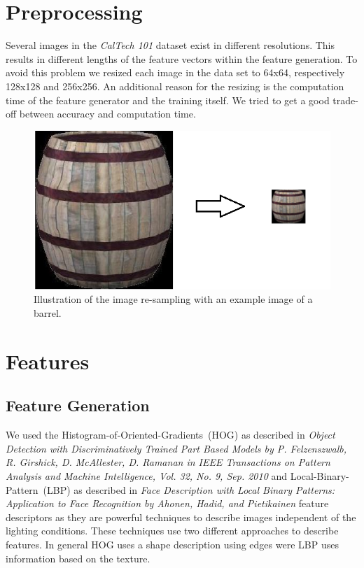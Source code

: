 \documentclass[a4paper,10pt]{article}
\begin{document}
\section{Preprocessing}
\label{sec:preprocessing}
Several images in the \emph{CalTech 101} dataset exist in different resolutions. 
This results in different lengths of the feature vectors within the feature generation.
To avoid this problem we resized each image in the data set to 64x64, respectively 128x128 and 256x256.
An additional reason for the resizing is the computation time of the feature generator and the training itself. 
We tried to get a good trade-off between accuracy and computation time.
\begin{figure}[ht]
\centering
\includegraphics[scale=0.5]{images/preprocessing.png}
\caption{Illustration of the image re-sampling with an example image of a barrel.}
\label{fig:resize}
\end{figure}

\section{Features}
\subsection{Feature Generation}

We used the Histogram-of-Oriented-Gradients~(HOG) as described in \emph{Object Detection with Discriminatively Trained Part Based Models by P. Felzenszwalb, R. Girshick, D. McAllester, D. Ramanan in IEEE Transactions on Pattern Analysis and Machine Intelligence, Vol. 32, No. 9, Sep. 2010}
and Local-Binary-Pattern~(LBP) as described in \emph{Face Description with Local Binary Patterns: Application to Face Recognition by Ahonen, Hadid, and Pietikainen}
feature descriptors as they are powerful techniques to describe images independent of the lighting conditions.
These techniques use two different approaches to describe features. In general HOG uses a shape description using edges were LBP uses information based on the texture.
\end{document}
